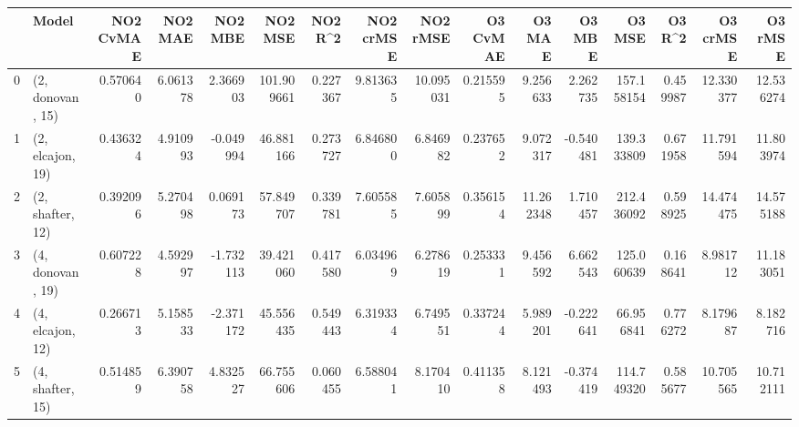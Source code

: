 \begin{tabular}{llrrrrrrrrrrrrrr}
\toprule
{} &             Model &  NO2 CvMAE &   NO2 MAE &   NO2 MBE &     NO2 MSE &   NO2 R\textasciicircum2 &  NO2 crMSE &   NO2 rMSE &  O3 CvMAE &     O3 MAE &    O3 MBE &      O3 MSE &    O3 R\textasciicircum2 &   O3 crMSE &    O3 rMSE \\
\midrule
0 &  (2, donovan, 15) &   0.570640 &  6.061378 &  2.366903 &  101.909661 &  0.227367 &   9.813635 &  10.095031 &  0.215595 &   9.256633 &  2.262735 &  157.158154 &  0.459987 &  12.330377 &  12.536274 \\
1 &  (2, elcajon, 19) &   0.436324 &  4.910993 & -0.049994 &   46.881166 &  0.273727 &   6.846800 &   6.846982 &  0.237652 &   9.072317 & -0.540481 &  139.333809 &  0.671958 &  11.791594 &  11.803974 \\
2 &  (2, shafter, 12) &   0.392096 &  5.270498 &  0.069173 &   57.849707 &  0.339781 &   7.605585 &   7.605899 &  0.356154 &  11.262348 &  1.710457 &  212.436092 &  0.598925 &  14.474475 &  14.575188 \\
3 &  (4, donovan, 19) &   0.607228 &  4.592997 & -1.732113 &   39.421060 &  0.417580 &   6.034969 &   6.278619 &  0.253331 &   9.456592 &  6.662543 &  125.060639 &  0.168641 &   8.981712 &  11.183051 \\
4 &  (4, elcajon, 12) &   0.266713 &  5.158533 & -2.371172 &   45.556435 &  0.549443 &   6.319334 &   6.749551 &  0.337244 &   5.989201 & -0.222641 &   66.956841 &  0.776272 &   8.179687 &   8.182716 \\
5 &  (4, shafter, 15) &   0.514859 &  6.390758 &  4.832527 &   66.755606 &  0.060455 &   6.588041 &   8.170410 &  0.411358 &   8.121493 & -0.374419 &  114.749320 &  0.585677 &  10.705565 &  10.712111 \\
\bottomrule
\end{tabular}
